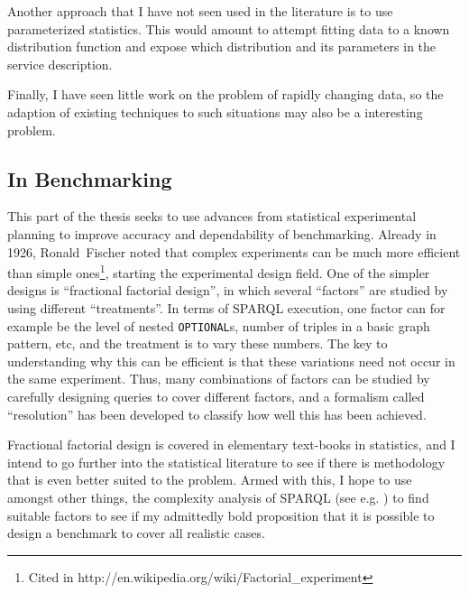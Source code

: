 \documentclass{llncs}
\begin{document}
Another approach that I have not seen used in the literature is to use
parameterized statistics. This would amount to attempt fitting data to
a known distribution function and expose which distribution and its
parameters in the service description.

Finally, I have seen little work on the problem of rapidly changing
data, so the adaption of existing techniques to such situations may
also be a interesting problem.


\subsection{In Benchmarking}

This part of the thesis seeks to use advances from statistical
experimental planning to improve accuracy and dependability of
benchmarking. Already in 1926, Ronald~Fischer noted that complex
experiments can be much more efficient than simple
ones\footnote{Cited in
  http://en.wikipedia.org/wiki/Factorial\_experiment}, starting the
experimental design field. One of the simpler designs is ``fractional
factorial design'', in which several ``factors'' are studied by using
different ``treatments''. In terms of SPARQL execution, one factor can
for example be the level of nested \texttt{OPTIONAL}s, number of
triples in a basic graph pattern, etc, and the treatment is to vary
these numbers. The key to understanding why this can be efficient is
that these variations need not occur in the same experiment. Thus,
many combinations of factors can be studied by carefully designing
queries to cover different factors, and a formalism called
``resolution'' has been developed to classify how well this has been
achieved.

Fractional factorial design is covered in elementary text-books in
statistics, and I intend to go further into the statistical literature
to see if there is methodology that is even better suited to the
problem. Armed with this, I hope to use amongst other things, the
complexity analysis of SPARQL (see
e.g. \cite{Schmidt:2010:FSQ:1804669.1804675}) to find suitable factors
to see if my admittedly bold proposition that it is possible to design
a benchmark to cover all realistic cases.




\end{document}
